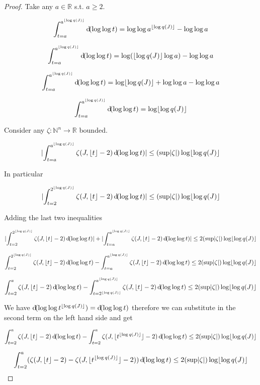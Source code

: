 \documentclass[11pt]{article}
\numberwithin{equation}{section}
\theoremstyle{definition}
\theoremstyle{plain}
\newcommand{\Nats}{\mathbb{N}}
\newcommand{\Reals}{\mathbb{R}}
\newcommand{\NatFun}{\Nats^n \rightarrow}
\newcommand{\Abs}[1]{\lvert #1 \rvert}
\newcommand{\Floor}[1]{\lfloor #1 \rfloor}
\begin{document}
\begin{proof}

Take any ${a \in \Reals}$ s.t. ${a \geq 2}$.

\[\int_{t = a}^{a^{\Floor{\log q(J)}}} \dif (\log \log t) = \log \log a^{\Floor{\log q(J)}} - \log \log a\]

\[\int_{t = a}^{a^{\Floor{\log q(J)}}} \dif (\log \log t) = \log (\Floor{\log q(J)} \log a) - \log \log a\]

\[\int_{t = a}^{a^{\Floor{\log q(J)}}} \dif (\log \log t) = \log \Floor{\log q(J)} + \log \log a - \log \log a\]

\[\int_{t = a}^{a^{\Floor{\log q(J)}}} \dif (\log \log t) = \log \Floor{\log q(J)}\]

Consider any ${\zeta: \NatFun \Reals}$ bounded.

\[\Abs{\int_{t = a}^{a^{\Floor{\log q(J)}}} \zeta(J,\Floor{t}-2) \dif (\log \log t)} \leq (\sup \Abs{\zeta}) \log \Floor{\log q(J)}\]

In particular

\[\Abs{\int_{t = 2}^{2^{\Floor{\log q(J)}}} \zeta(J,\Floor{t}-2) \dif (\log \log t)} \leq (\sup \Abs{\zeta}) \log \Floor{\log q(J)}\]

Adding the last two inequalities

\[\Abs{\int_{t = 2}^{2^{\Floor{\log q(J)}}} \zeta(J,\Floor{t}-2) \dif (\log \log t)} + \Abs{\int_{t = a}^{a^{\Floor{\log q(J)}}} \zeta(J,\Floor{t}-2) \dif (\log \log t)} \leq 2(\sup \Abs{\zeta}) \log \Floor{\log q(J)}\]

\[\int_{t = 2}^{2^{\Floor{\log q(J)}}} \zeta(J,\Floor{t}-2) \dif (\log \log t) - \int_{t = a}^{a^{\Floor{\log q(J)}}} \zeta(J,\Floor{t}-2) \dif (\log \log t) \leq 2(\sup \Abs{\zeta}) \log \Floor{\log q(J)}\]

\[\int_{t = 2}^{a} \zeta(J,\Floor{t}-2) \dif (\log \log t) - \int_{t=2^{\Floor{\log q(J)}}}^{a^{\Floor{\log q(J)}}} \zeta(J,\Floor{t}-2) \dif (\log \log t) \leq 2(\sup \Abs{\zeta}) \log \Floor{\log q(J)}\]

We have ${\dif (\log \log t^{\Floor{\log q(J)}}) = \dif(\log \log t)}$ therefore we can substitute in the second term on the left hand side and get

\[\int_{t = 2}^{a} \zeta(J,\Floor{t}-2) \dif (\log \log t) - \int_{t=2}^{a} \zeta(J,\Floor{t^{\Floor{\log q(J)}}}-2) \dif (\log \log t) \leq 2(\sup \Abs{\zeta}) \log \Floor{\log q(J)}\]

\[\int_{t = 2}^{a} (\zeta(J,\Floor{t}-2) - \zeta(J,\Floor{t^{\Floor{\log q(J)}}}-2)) \dif (\log \log t) \leq 2(\sup \Abs{\zeta}) \log \Floor{\log q(J)}\]


\end{proof}
\end{document}
